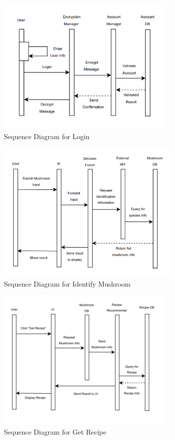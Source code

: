 \documentclass[]{article}
\begin{document}
\begin{figure}[H]
    \centering
    \includegraphics[width=0.77\textwidth]{LoginSequenceDiagram.png}
    \caption{Sequence Diagram for Login}
    \label{fig:login}
\end{figure}

\begin{figure}[H]
    \centering
    \includegraphics[width=0.8\textwidth]{IdentifyMushroomSequenceDiagram.png}
    \caption{Sequence Diagram for Identify Mushroom}
    \label{fig:identify}
\end{figure}


\begin{figure}[H]
    \centering
    \includegraphics[width=0.76\textwidth]{GetRecipeSequenceDiagram.png}
    \caption{Sequence Diagram for Get Recipe}
    \label{fig:recipe}
\end{figure}
\end{document}
